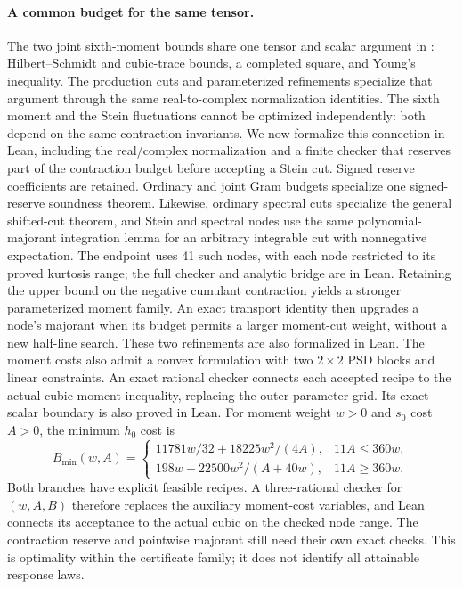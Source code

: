 \documentclass[11pt,a4paper]{article}
\begin{document}
\paragraph{A common budget for the same tensor.}
The two joint sixth-moment bounds share one tensor and scalar argument in
: Hilbert--Schmidt and cubic-trace bounds, a completed
square, and Young's inequality. The production cuts and parameterized refinements
specialize that argument through the same real-to-complex normalization identities.
The sixth moment and the Stein fluctuations cannot be optimized independently:
both depend on the same contraction invariants. We now formalize this connection
in Lean, including the real/complex normalization and a finite checker that reserves
part of the contraction budget before accepting a Stein cut. Signed reserve
coefficients are retained. Ordinary and joint Gram budgets specialize one signed-reserve
soundness theorem. Likewise, ordinary spectral cuts specialize the general shifted-cut
theorem, and Stein and spectral nodes use the same polynomial-majorant integration lemma for an
arbitrary integrable cut with nonnegative expectation. The endpoint uses 41 such nodes, with each node restricted
to its proved kurtosis range; the full checker and analytic bridge are in Lean.
Retaining the upper bound on the negative cumulant contraction yields a stronger
parameterized moment family. An exact transport identity then upgrades a node's
majorant when its budget permits a larger moment-cut weight, without a new
half-line search. These two refinements are also formalized in Lean.
The moment costs also admit a convex formulation with two $2\times2$ PSD blocks
and linear constraints. An exact rational checker connects each accepted recipe
to the actual cubic moment inequality, replacing the outer parameter grid.
Its exact scalar boundary is also proved in Lean. For moment weight $w>0$ and
$s_0$ cost $A>0$, the minimum $h_0$ cost is
\[
 B_{\min}(w,A)=
 \begin{cases}
 11781w/32+18225w^2/(4A),&11A\le360w,\\
 198w+22500w^2/(A+40w),&11A\ge360w.
 \end{cases}
\]
Both branches have explicit feasible recipes. A three-rational checker for
$(w,A,B)$ therefore replaces the auxiliary moment-cost variables, and Lean
connects its acceptance to the actual cubic on the checked node range. The
contraction reserve and pointwise majorant still need their own exact checks.
This is optimality within the certificate family; it does not identify all
attainable response laws.
\end{document}
